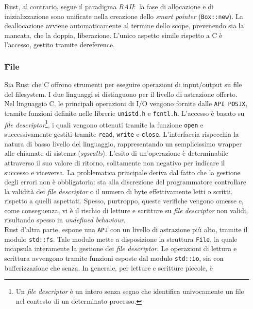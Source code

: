 Rust, al contrario, segue il paradigma \textit{RAII}:\  la fase di allocazione e di inizializzazione sono unificate nella creazione dello \textit{smart pointer} (\texttt{Box::new}). La deallocazione 
avviene automaticamente al termine dello scope, prevenendo sia la mancata, che la doppia, liberazione. L'unico aspetto simile rispetto a C è l'accesso, gestito tramite dereference.

\subsubsection{File}
Sia Rust che C offrono strumenti per eseguire operazioni di input/output su file del filesystem. I due linguaggi si distinguono per
il livello di astrazione offerto. \hfill
\vspace{10pt}\\
\noindent Nel linguaggio C, le principali operazioni di I/O vengono fornite dalle \texttt{API POSIX}, tramite funzioni definite nelle librerie \texttt{unistd.h} e \texttt{fcntl.h}.
L'accesso è basato su \textit{file descriptor}\footnote{Un \textit{file descriptor} è un intero senza segno che identifica univocamente un file nel contesto di un determinato processo.}, 
i quali vengono ottenuti tramite la funzione \texttt{open} e successivamente gestiti tramite \texttt{read}, \texttt{write} e \texttt{close}.
L'interfaccia rispecchia la natura di basso livello del linguaggio, rappresentando un semplicissimo wrapper alle chiamate di sistema (\textit{syscalls}). L'esito di un'operazione è determinabile attraverso il suo valore di ritorno, solitamente non negativo per indicare il successo e viceversa.
La problematica principale deriva dal fatto che la gestione degli errori non è obbligatoria: sta alla discrezione del programmatore controllare la validità dei \textit{file descriptor}
 o il numero di byte effettivamente letti o scritti, rispetto a quelli aspettati.
Spesso, purtroppo, queste verifiche vengono omesse e, come conseguenza, vi è il rischio di letture e scritture su \textit{file descriptor} non validi, risultando spesso in \textit{undefined behaviour}. \hfill
\vspace{10pt}\\
\noindent Rust d'altra parte, espone una \texttt{API} con un livello di astrazione più alto, tramite il modulo \texttt{std::fs}. Tale modulo mette a disposizione la struttura \texttt{File}, la quale 
incapsula interamente la gestione dei \textit{file descriptor}.
Le operazioni di lettura e scrittura avvengono tramite funzioni esposte dal modulo \texttt{std::io}, sia con bufferizzazione che senza. In generale, per letture e scritture piccole, è
